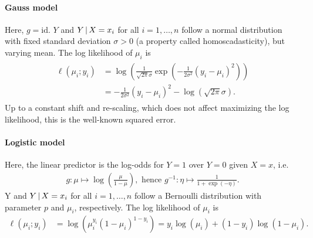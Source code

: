 \paragraph{Gauss model}
Here, $g = \text{id}$. $Y$ and $Y \,|\, X = x_i$ for all $i = 1, \ldots, n$ follow a normal
distribution with fixed standard deviation $\sigma > 0$ (a property called homoscadasticity), but 
varying mean. The log likelihood of $\mu_i$ is
\begin{align}
\begin{split}
    \ell(\mu_i; y_i) &= \log\left( \frac{1}{\sqrt{2\pi}\sigma} 
        \exp \left( -\frac{1}{2\sigma^2}(y_i - \mu_i)^2 \right) \right) \\
    &= -\frac{1}{2\sigma^2}(y_i - \mu_i)^2 - \log \left( \sqrt{2\pi}\sigma \right).
\end{split}
\end{align}
Up to a constant shift and re-scaling, which does not affect maximizing the log likelihood, this
is the well-known squared error.

\paragraph{Logistic model}
Here, the linear predictor is the log-odds for $Y = 1$ over $Y = 0$ given $X = x$, i.e.
\begin{align}
    g: \mu \mapsto \log\left( \frac{\mu}{1 - \mu} \right), \text{ hence } g^{-1}: \eta \mapsto
    \frac{1}{1 + \exp(-\eta)}.
\end{align}
Y and $Y \,|\, X = x_i$ for all $i = 1, \ldots, n$ follow a Bernoulli distribution with parameter 
$p$ and $\mu_i$, respectively. The log likelihood of $\mu_i$ is
\begin{align}
    \ell(\mu_i; y_i) &= \log\left( \mu_i^{y_i} (1 - \mu_i)^{1 - y_i} \right) 
    = y_i \log(\mu_i) + (1 - y_i) \log(1 - \mu_i). 
\end{align}


